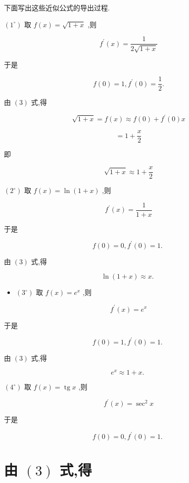 \documentclass[10pt]{article}
\begin{document}
下面写出这些近似公式的导出过程.

\(\left( {1}^{ \circ }\right)\) 取 \(f\left( x\right) = \sqrt{1 + x}\) ,则

\[
{f}^{\prime }\left( x\right) = \frac{1}{2\sqrt{1 + x}}
\]

于是

\[
f\left( 0\right) = 1,{f}^{\prime }\left( 0\right) = \frac{1}{2}.
\]

由 \(\left( 3\right)\) 式,得

\[
\sqrt{1 + x} = f\left( x\right) \approx f\left( 0\right) + {f}^{\prime }\left( 0\right) x
\]

\[
= 1 + \frac{x}{2}
\]

即

\[
\sqrt{1 + x} \approx 1 + \frac{x}{2}
\]

\(\left( {2}^{ \circ }\right)\) 取 \(f\left( x\right) = \ln \left( {1 + x}\right)\) ,则

\[
{f}^{\prime }\left( x\right) = \frac{1}{1 + x}
\]

于是

\[
f\left( 0\right) = 0,{f}^{\prime }\left( 0\right) = 1\text{. }
\]

由 \(\left( 3\right)\) 式,得

\[
\ln \left( {1 + x}\right) \approx x\text{. }
\]

\begin{itemize}
\item \(\left( {3}^{ \circ }\right)\) 取 \(f\left( x\right) = {e}^{x}\) ,则
\end{itemize}

\[
{f}^{\prime }\left( x\right) = {e}^{x}
\]

于是

\[
f\left( 0\right) = 1,{f}^{\prime }\left( 0\right) = 1\text{. }
\]

由 \(\left( 3\right)\) 式,得

\[
{e}^{x} \approx 1 + x\text{. }
\]

\(\left( {4}^{ \circ }\right)\) 取 \(f\left( x\right) = \operatorname{tg}x\) ,则

\[
{f}^{\prime }\left( x\right) = {\sec }^{2}x
\]

于是

\[
f\left( 0\right) = 0,{f}^{\prime }\left( 0\right) = 1\text{. }
\]

\section*{由 \(\left( 3\right)\) 式,得}
\end{document}
